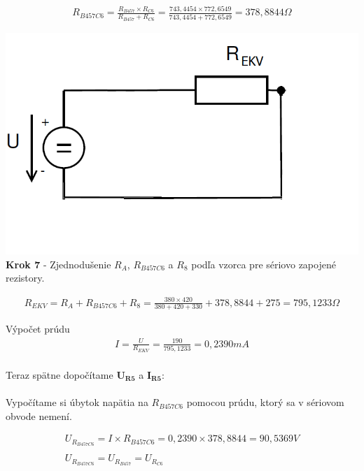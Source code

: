 \begin{gather*}
R_{B457C6}=\frac{R_{B457}  \times R_{C6}}{R_{B457}+R_{C6}}=\frac{743,4454  \times 772,6549}{743,4454+772,6549}=378,8844\Omega 
\end{gather*}

\begin{center}
\includegraphics[scale=0.5,keepaspectratio]{fig/obr/Pr1_7.png} \\
\textbf{Krok 7} - Zjednodušenie $R_{A}$, $R_{B457C6}$ a $R_{8}$ podľa vzorca pre sériovo zapojené rezistory.
\end{center}

\begin{gather*}
R_{EKV}=R_{A}+R_{B457C6}+R_{8}=\frac{380 \times 420}{380+420+330}+378,8844+275=795,1233\Omega 
\end{gather*}



Výpočet prúdu
\begin{gather*}
    I = \frac{U}{R_{EKV}} = \frac{190}{795,1233} = 0,2390mA \\
\end{gather*}

\newpage

\noindent Teraz spätne dopočítame $\boldsymbol{U_{R5}}$ a $\boldsymbol{I_{R5}}$:
\\\\
Vypočítame si úbytok napätia na $R_{B457C6}$ pomocou prúdu, ktorý sa v sériovom obvode nemení.

\begin{gather*}
    U_{R_{B457C6}} = I \times R_{B457C6} = 0,2390 \times 378,8844 = 90,5369V \\\\
   U_{R_{B457C6}} = U_{R_{B457}} = U_{R_{C6}} \\
\end{gather*}

